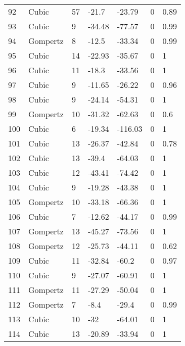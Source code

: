 \documentclass[11pt]{article}
\begin{document}
\begin{center}
\begin{longtable}{lllllll}
    92  & Cubic     & 57              & -21.7   & -23.79  & 0       & 0.89 \\
    93  & Cubic     & 9               & -34.48  & -77.57  & 0       & 0.99 \\
    94  & Gompertz  & 8               & -12.5   & -33.34  & 0       & 0.99 \\
    95  & Cubic     & 14              & -22.93  & -35.67  & 0       & 1    \\
    96  & Cubic     & 11              & -18.3   & -33.56  & 0       & 1    \\
    97  & Cubic     & 9               & -11.65  & -26.22  & 0       & 0.96 \\
    98  & Cubic     & 9               & -24.14  & -54.31  & 0       & 1    \\
    99  & Gompertz  & 10              & -31.32  & -62.63  & 0       & 0.6  \\
    100 & Cubic     & 6               & -19.34  & -116.03 & 0       & 1    \\
    101 & Cubic     & 13              & -26.37  & -42.84  & 0       & 0.78 \\
    102 & Cubic     & 13              & -39.4   & -64.03  & 0       & 1    \\
    103 & Cubic     & 12              & -43.41  & -74.42  & 0       & 1    \\
    104 & Cubic     & 9               & -19.28  & -43.38  & 0       & 1    \\
    105 & Gompertz  & 10              & -33.18  & -66.36  & 0       & 1    \\
    106 & Cubic     & 7               & -12.62  & -44.17  & 0       & 0.99 \\
    107 & Gompertz  & 13              & -45.27  & -73.56  & 0       & 1    \\
    108 & Gompertz  & 12              & -25.73  & -44.11  & 0       & 0.62 \\
    109 & Cubic     & 11              & -32.84  & -60.2   & 0       & 0.97 \\
    110 & Cubic     & 9               & -27.07  & -60.91  & 0       & 1    \\
    111 & Gompertz  & 11              & -27.29  & -50.04  & 0       & 1    \\
    112 & Gompertz  & 7               & -8.4    & -29.4   & 0       & 0.99 \\
    113 & Cubic     & 10              & -32     & -64.01  & 0       & 1    \\
    114 & Cubic     & 13              & -20.89  & -33.94  & 0       & 1    \\

\end{longtable}
\end{center}
\end{document}
